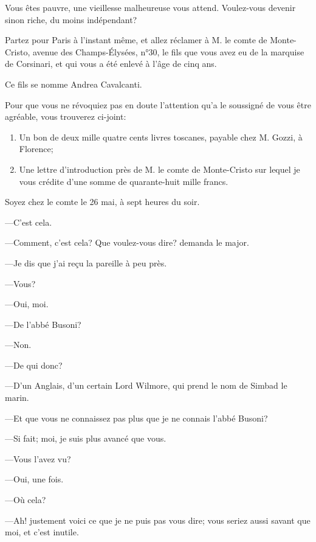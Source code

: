 \begin{mail}{}{}
Vous êtes pauvre, une vieillesse malheureuse vous attend. Voulez-vous devenir sinon riche, du moins indépendant? 

Partez pour Paris à l'instant même, et allez réclamer à M. le comte de Monte-Cristo, avenue des Champs-Élysées, n°30, le fils que vous avez eu de la marquise de Corsinari, et qui vous a été enlevé à l'âge de cinq ans. 

Ce fils se nomme Andrea Cavalcanti. 

Pour que vous ne révoquiez pas en doute l'attention qu'a le soussigné de vous être agréable, vous trouverez ci-joint: 

\begin{enumerate}
\item Un bon de deux mille quatre cents livres toscanes, payable chez M. Gozzi, à Florence; 

\item Une lettre d'introduction près de M. le comte de Monte-Cristo sur lequel je vous crédite d'une somme de quarante-huit mille francs. 
\end{enumerate}

Soyez chez le comte le 26 mai, à sept heures du soir. 


\end{mail}

—C'est cela. 

—Comment, c'est cela? Que voulez-vous dire? demanda le major. 

—Je dis que j'ai reçu la pareille à peu près. 

—Vous? 

—Oui, moi. 

—De l'abbé Busoni? 

—Non. 

—De qui donc? 

—D'un Anglais, d'un certain Lord Wilmore, qui prend le nom de Simbad le marin. 

—Et que vous ne connaissez pas plus que je ne connais l'abbé Busoni? 

—Si fait; moi, je suis plus avancé que vous. 

—Vous l'avez vu? 

—Oui, une fois. 

—Où cela? 

—Ah! justement voici ce que je ne puis pas vous dire; vous seriez aussi savant que moi, et c'est inutile. 

